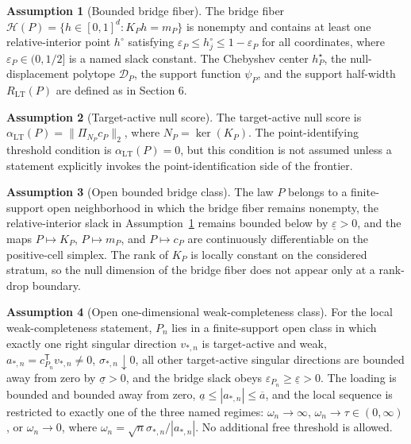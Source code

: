 \documentclass[11pt]{article}
\newcommand{\transpose}{\mathsf{T}}
\newcommand{\calH}{\mathcal{H}}
\theoremstyle{definition}
\newtheorem{assumption}{Assumption}
\theoremstyle{plain}
\theoremstyle{remark}
\begin{document}
\begin{assumption}[Bounded bridge fiber]\label{ass:bounded-fiber}
The bridge fiber \(\calH(P)=\{h\in[0,1]^d:K_Ph=m_P\}\) is nonempty and contains
at least one relative-interior point \(h^\circ\) satisfying
\(\varepsilon_P\le h^\circ_j\le 1-\varepsilon_P\) for all coordinates, where
\(\varepsilon_P\in(0,1/2]\) is a named slack constant.  The Chebyshev center
\(h_P^\star\), the null-displacement polytope \(\mathcal{D}_P\), the support function
\(\psi_P\), and the support half-width \(R_{\mathrm{LT}}(P)\) are defined as in
Section 6.
\end{assumption}

\begin{assumption}[Target-active null score]\label{ass:null-score}
The target-active null score is \(\alpha_{\mathrm{LT}}(P)=\|\Pi_{N_P}c_P\|_2\),
where \(N_P=\ker(K_P)\).  The point-identifying threshold condition is
\(\alpha_{\mathrm{LT}}(P)=0\), but this condition is not assumed unless a
statement explicitly invokes the point-identification side of the frontier.
\end{assumption}

\begin{assumption}[Open bounded bridge class]\label{ass:open-bridge}
The law \(P\) belongs to a finite-support open neighborhood in which the bridge
fiber remains nonempty, the relative-interior slack in
Assumption~\ref{ass:bounded-fiber} remains bounded below by
\(\underline{\varepsilon}>0\), and the maps \(P\mapsto K_P\), \(P\mapsto m_P\),
and \(P\mapsto c_P\) are continuously differentiable on the positive-cell
simplex.  The rank of \(K_P\) is locally constant on the considered stratum, so
the null dimension of the bridge fiber does not appear only at a rank-drop
boundary.
\end{assumption}

\begin{assumption}[Open one-dimensional weak-completeness class]\label{ass:open-weak}
For the local weak-completeness statement, \(P_n\) lies in a finite-support
open class in which exactly one right singular direction \(v_{*,n}\) is
target-active and weak, \(a_{*,n}=c_{P_n}^\transpose v_{*,n}\neq0\),
\(\sigma_{*,n}\downarrow0\), all other target-active singular directions are
bounded away from zero by \(\underline{\sigma}>0\), and the bridge slack obeys
\(\varepsilon_{P_n}\ge\underline{\varepsilon}>0\).  The loading is bounded and
bounded away from zero, \(\underline a\le |a_{*,n}|\le\overline a\), and the
local sequence is restricted to exactly one of the three named regimes:
\(\omega_n\to\infty\), \(\omega_n\to\tau\in(0,\infty)\), or
\(\omega_n\to0\), where
\(\omega_n=\sqrt{n}\sigma_{*,n}/|a_{*,n}|\).  No additional free threshold is
allowed.
\end{assumption}
\end{document}
